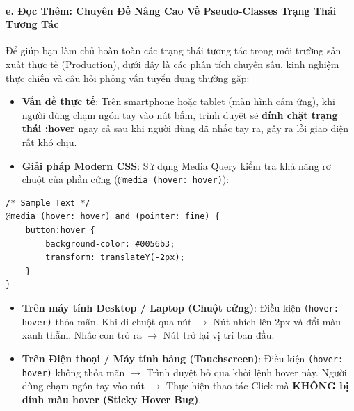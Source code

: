 \documentclass[11pt,oneside]{book}
\newcommand{\codeinline}[1]{\textcolor{accentOrange}{\texttt{#1}}}
\begin{document}
\paragraph{e. Đọc Thêm: Chuyên Đề Nâng Cao Về Pseudo-Classes Trạng Thái Tương Tác}

Để giúp bạn làm chủ hoàn toàn các trạng thái tương tác trong môi trường sản xuất thực tế (Production), dưới đây là các phân tích chuyên sâu, kinh nghiệm thực chiến và câu hỏi phỏng vấn tuyển dụng thường gặp:

\begin{conceptBox}
\begin{itemize}[leftmargin=1.5em, itemsep=3pt, parsep=0pt]
    \item \textbf{Vấn đề thực tế}: Trên smartphone hoặc tablet (màn hình cảm ứng), khi người dùng chạm ngón tay vào nút bấm, trình duyệt sẽ \textbf{dính chặt trạng thái :hover} ngay cả sau khi người dùng đã nhấc tay ra, gây ra lỗi giao diện rất khó chịu.
    \item \textbf{Giải pháp Modern CSS}: Sử dụng Media Query kiểm tra khả năng rơ chuột của phần cứng (\codeinline{@media (hover: hover)}):
\end{itemize}
\begin{codeWindow}
\begin{lstlisting}[language=CSS3]
/* Sample Text */
@media (hover: hover) and (pointer: fine) {
    button:hover {
        background-color: #0056b3;
        transform: translateY(-2px);
    }
}
\end{lstlisting}
\end{codeWindow}

\begin{browserWindow}
\begin{itemize}[leftmargin=1.5em, itemsep=3pt, parsep=0pt]
    \item \textbf{Trên máy tính Desktop / Laptop (Chuột cứng)}: Điều kiện \codeinline{(hover: hover)} thỏa mãn. Khi di chuột qua nút $\rightarrow$ Nút nhích lên $2\text{px}$ và đổi màu xanh thẫm. Nhấc con trỏ ra $\rightarrow$ Nút trở lại vị trí ban đầu.
    \item \textbf{Trên Điện thoại / Máy tính bảng (Touchscreen)}: Điều kiện \codeinline{(hover: hover)} không thỏa mãn $\rightarrow$ Trình duyệt bỏ qua khối lệnh hover này. Người dùng chạm ngón tay vào nút $\rightarrow$ Thực hiện thao tác Click mà \textbf{KHÔNG bị dính màu hover (Sticky Hover Bug)}.
\end{itemize}
\end{browserWindow}
\end{conceptBox}
\end{document}

